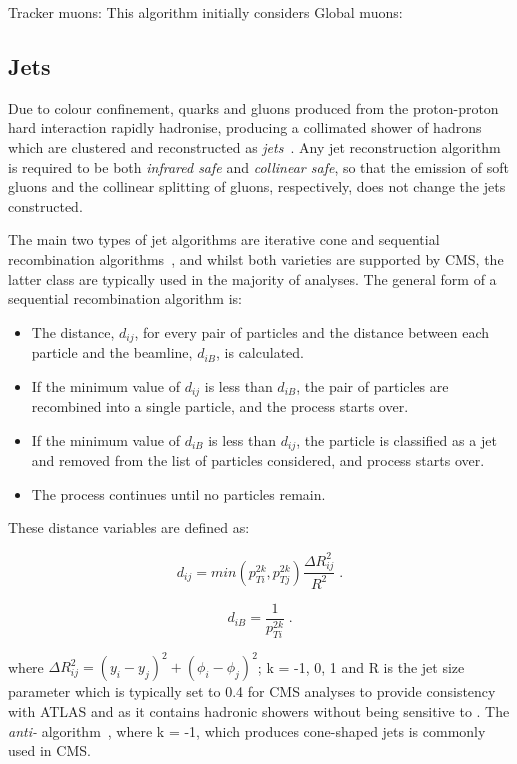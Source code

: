 {Tracker muons:
This algorithm initially considers  
Global muons:

\subsection{Jets}
Due to colour confinement, quarks and gluons produced from the proton-proton hard interaction rapidly hadronise, producing a collimated shower of hadrons which are clustered and reconstructed as \emph{jets}~\cite{Salam:2009jx}.
Any jet reconstruction algorithm is required to be both \emph{infrared safe} and \emph{collinear safe}, \ie so that the emission of soft gluons and the collinear splitting of gluons, respectively, does not change the jets constructed.

The main two types of jet algorithms are iterative cone and sequential recombination algorithms~\cite{Salam:2009jx}, and whilst both varieties are supported by CMS, the latter class are typically used in the majority of analyses.
The general form of a sequential recombination algorithm is:
\begin{itemize}
\item The distance, $d_{ij}$, for every pair of particles and the distance between each particle and the beamline, $d_{iB}$, is calculated.
\item If the minimum value of $d_{ij}$ is less than $d_{iB}$, the pair of particles are recombined into a single particle, and the process starts over.
\item If the minimum value of $d_{iB}$ is less than $d_{ij}$, the particle is classified as a jet and removed from the list of particles considered, and process starts over.
\item The process continues until no particles remain.
\end{itemize}

These distance variables are defined as:

\begin{equation}
d_{ij} = min(p^{2k}_{Ti},p^{2k}_{Tj}) \frac{\Delta R^{2}_{ij}}{R^{2}} \;.
\label{eq:jetAlgo1}
\end{equation}

\begin{equation}
d_{iB} = \frac{1}{p^{2k}_{Ti}} \;.
\label{eq:jetAlgo2}
\end{equation}

where $\Delta R^{2}_{ij} = (y_{i} - y_{j})^{2} + (\phi_{i} - \phi_{j})^{2}$; k = -1, 0, 1 and R is the jet size parameter which is typically set to 0.4 for CMS analyses to provide consistency with ATLAS and as it contains hadronic showers without being sensitive to \PU.
The \emph{anti-\kt} algorithm~\cite{Cacciari:2008gp}, where k = -1, which produces cone-shaped jets is commonly used in CMS.

}
